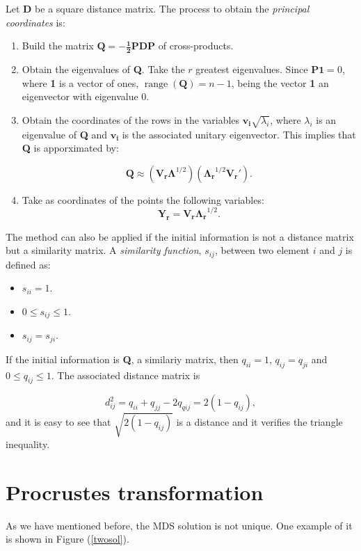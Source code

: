 \documentclass[11pt]{report}
\DeclareMathOperator{\range}{range}
\begin{document}
\indent Let \textbf{D} be a square distance matrix. The process to obtain 
the \textit{principal coordinates} is:

\begin{enumerate}
\item Build the matrix $\mathbf{Q = - \frac{1}{2} PDP}$ of cross-products.
\item Obtain the eigenvalues of \textbf{Q}. Take the $r$ greatest eigenvalues. 
Since $\mathbf{P1}=0$, where \textbf{1} is a vector of ones, 
$\range(\mathbf{Q})=n-1$, being the vector \textbf{1} an eigenvector with 
eigenvalue 0. 
\item Obtain the coordinates of the rows in the variables 
$\mathbf{v_i}\sqrt{\lambda_i}$,
where $\lambda_i$ is an eigenvalue of \textbf{Q} and $\mathbf{v_i}$ is the
associated unitary eigenvector. This implies that \textbf{Q} is apporximated by:

\[
\mathbf{Q} \approx (\mathbf{V_r \Lambda}^{1/2})(\mathbf{\Lambda_r}^{1/2} \mathbf{V_r'}).
\]

\item Take as coordinates of the points the following variables:
\[
\mathbf{Y_r} = \mathbf{V_r}\mathbf{\Lambda_r}^{1/2}.
\]
\end{enumerate}

\indent The method can also be applied if the initial information is not a 
distance matrix but a similarity matrix. A \textit{similarity function}, 
$s_{ij}$, between two element $i$ and $j$  is defined as:

\begin{itemize}
\item $s_{ii} = 1$.
\item $0 \leq s_{ij} \leq 1$.
\item $s_{ij} = s_{ji}$.
\end{itemize}

If the initial information is \textbf{Q}, a similariy matrix, then $q_{ii} = 1$,
$q_{ij} = q_{ji}$ and $0 \leq q_{ij} \leq 1$. The associated distance matrix 
is

\[
d_{ij}^2 = q_{ii} + q_{jj} - 2q_{qij} = 2(1-q_{ij}),
\]
and it is easy to see that $\sqrt{2(1-q_{ij})}$ is a distance and it verifies
the triangle inequality.


\section{Procrustes transformation}
As we have mentioned before, the MDS solution is not unique. One example of it 
is shown in Figure (\ref{twosol}).
\end{document}
